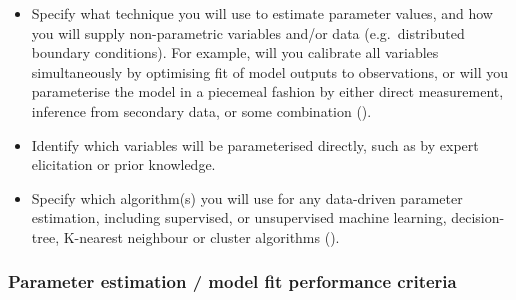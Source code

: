 \documentclass[
]{article}
\providecommand{\tightlist}{%
  \setlength{\itemsep}{0pt}\setlength{\parskip}{0pt}}
\begin{document}
\begin{tcolorbox}[enhanced jigsaw, opacitybacktitle=0.6, bottomrule=.15mm, leftrule=.75mm, rightrule=.15mm, colbacktitle=quarto-callout-caution-color!10!white, toprule=.15mm, titlerule=0mm, left=2mm, colframe=quarto-callout-caution-color-frame, breakable, title=\textcolor{quarto-callout-caution-color}{\faFire}\hspace{0.5em}{Preregistration Item}, opacityback=0, coltitle=black, bottomtitle=1mm, colback=white, toptitle=1mm, arc=.35mm]

\begin{itemize}
\tightlist
\item[$\square$]
  Specify what technique you will use to estimate parameter values, and
  how you will supply non-parametric variables and/or data
  (e.g.~distributed boundary conditions). For example, will you
  calibrate all variables simultaneously by optimising fit of model
  outputs to observations, or will you parameterise the model in a
  piecemeal fashion by either direct measurement, inference from
  secondary data, or some combination
  ().
\item[$\square$]
  Identify which variables will be parameterised directly, such as by
  expert elicitation or prior knowledge.
\item[$\square$]
  Specify which algorithm(s) you will use for any data-driven parameter
  estimation, including supervised, or unsupervised machine learning,
  decision-tree, K-nearest neighbour or cluster algorithms
  ().
\end{itemize}

\end{tcolorbox}

\subsubsection{Parameter estimation / model fit performance
criteria}\label{sec-parameter-model-fit-performance-criteria}
\end{document}

